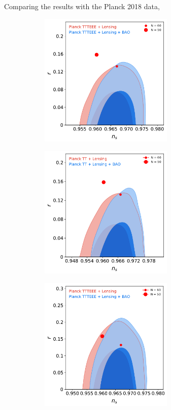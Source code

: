 Comparing the results with the Planck 2018 data,
\begin{figure}[H]
\begin{subfigure}[b]{.5\textwidth}
\centering
\includegraphics[width=0.7\textwidth]{./figures/fig1.pdf}
\end{subfigure}
\begin{subfigure}[b]{.5\textwidth}
\centering
\includegraphics[width=0.7\textwidth]{./figures/fig4.pdf}
\end{subfigure}
\caption{Tensor power spectrum amplitude ($r$)}
\begin{subfigure}[b]{.5\textwidth}
\centering
\includegraphics[width=0.7\textwidth]{./figures/fig2.pdf}

\end{subfigure}
\end{figure}
